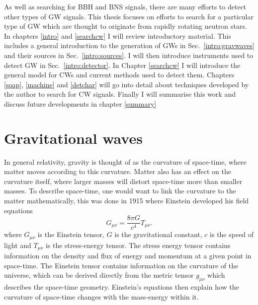 As well as searching for \gls{BBH} and \gls{BNS} signals, there are many
efforts to detect other types of \gls{GW} signals.  This thesis focuses on
efforts to search for a particular type of \gls{GW} which are thought to
originate from rapidly rotating neutron stars.  In chapters \ref{intro} and
\ref{searchcw} I will review introductory material.  This includes a general
introduction to the generation of \glspl{GW} in Sec.~\ref{intro:gravwaves} and
their sources in Sec.~\ref{intro:sources}.  I will then introduce instruments
used to detect \gls{GW} in Sec.~\ref{intro:detector}.  In Chapter
\ref{searchcw} I will introduce the general model for \glspl{CW} and current
methods used to detect them.  Chapters \ref{soap}, \ref{machine} and
\ref{detchar} will go into detail about techniques developed by the author to
search for \gls{CW} signals.  Finally I will summarise this work and discuss
future developments in chapter \ref{summary}
~

\section{\label{intro:gravwaves}Gravitational waves}

In general relativity, gravity is thought of as the curvature of space-time, where
matter moves according to this curvature. Matter also has
an effect on the curvature itself, where larger masses will distort space-time more than smaller masses. 
To describe space-time, one would want to link the curvature to the matter mathematically, this was done in 1915 \citep{einstein2005GrundlageAllgemeinen} where Einstein developed his field equations
\begin{equation}
\label{intro:gravwaves:efe}
    G_{\mu \nu} = \frac{8 \pi G}{c^4}T_{\mu \nu}.
\end{equation}
where $G_{\mu \nu}$ is the Einstein tensor, $G$ is the gravitational constant, $c$ is the speed of light and $T_{\mu \nu}$ is the
stress-energy tensor.  The stress energy tensor contains information on the density and flux of energy and momentum at a given point in space-time.  
The Einstein tensor contains information on the curvature of the
universe, which can be derived directly from the metric tensor $g_{\mu \nu}$
which describes the space-time geometry.
Einstein's equations then explain how the curvature of space-time changes with
the mass-energy within it.  

